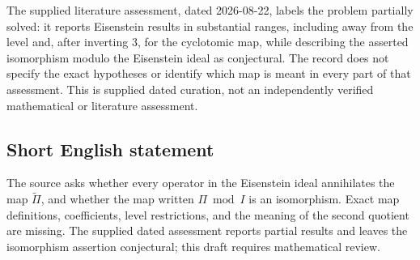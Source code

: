 \documentclass[11pt]{article}
\begin{document}
The supplied literature assessment, dated 2026-08-22, labels the problem partially solved: it reports Eisenstein results in substantial ranges, including away from the level and, after inverting \(3\), for the cyclotomic map, while describing the asserted isomorphism modulo the Eisenstein ideal as conjectural. The record does not specify the exact hypotheses or identify which map is meant in every part of that assessment. This is supplied dated curation, not an independently verified mathematical or literature assessment.
\subsection{Short English statement}
The source asks whether every operator in the Eisenstein ideal annihilates the map \(\widetilde\Pi\), and whether the map written \(\Pi\bmod I\) is an isomorphism. Exact map definitions, coefficients, level restrictions, and the meaning of the second quotient are missing. The supplied dated assessment reports partial results and leaves the isomorphism assertion conjectural; this draft requires mathematical review.
\end{document}
